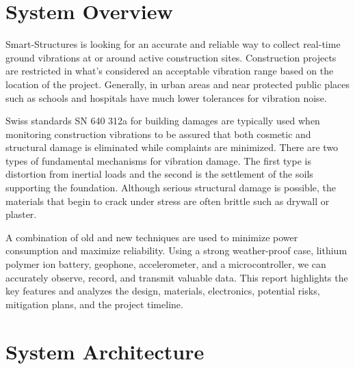 \documentclass[12pt]{article}
\begin{document}
\section{System Overview}
Smart-Structures is looking for an accurate and reliable way to collect real-time ground vibrations at or around active construction sites. Construction projects are restricted in what's considered an acceptable vibration range based on the location of the project. Generally, in urban areas and near protected public places such as schools and hospitals have much lower tolerances for vibration noise.

Swiss standards SN 640 312a \cite{src1} for building damages are typically used when monitoring construction vibrations to be assured that both cosmetic and structural damage is eliminated while complaints are minimized. There are two types of fundamental mechanisms for vibration damage. The first type is distortion from inertial loads and the second is the settlement of the soils supporting the foundation. Although serious structural damage is possible, the materials that begin to crack under stress are often brittle such as drywall or plaster.

A combination of old and new techniques are used to minimize power consumption and maximize reliability. Using a strong weather-proof case, lithium polymer ion battery, geophone, accelerometer, and a microcontroller, we can accurately observe, record, and transmit valuable data. This report highlights the key features and analyzes the design, materials, electronics, potential risks, mitigation plans, and the project timeline.

\section{System Architecture}
\end{document}

